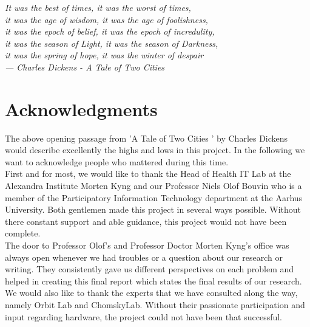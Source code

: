 
\begin{flushright}{\slshape    
	It was the best of times, it was the worst of times,\\
	it was the age of wisdom, it was the age of foolishness,\\ 
	it was the epoch of belief, it was the epoch of incredulity,\\ 
	it was the season of Light, it was the season of Darkness,\\
	it was the spring of hope, it was the winter of despair\\ \medskip
    --- Charles Dickens - A Tale of Two Cities \cite{dickens}}
\end{flushright}



\bigskip

\begingroup
\let\clearpage\relax
\let\cleardoublepage\relax
\let\cleardoublepage\relax
\chapter*{Acknowledgments}

The above opening passage from 'A Tale of Two  Cities ' by Charles Dickens would describe excellently the highs and lows in this project. In the following we want to acknowledge people who mattered during this time.\\

First and for most, we would like to thank the Head of Health IT Lab at the Alexandra Institute Morten Kyng and our Professor Niels Olof Bouvin who is a member of the Participatory Information Technology department at the Aarhus University. Both gentlemen made this project in several ways possible. Without there constant support and able guidance, this project would not have been complete.\\

The door to Professor Olof's and Professor Doctor Morten Kyng's office was always open whenever we had troubles or a question about our research or writing. They consistently gave us different perspectives on each problem and helped in creating this final report which states the final results of our research.\\

We would also like to thank the experts that we have consulted along the way, namely Orbit Lab and ChomskyLab. 
Without their passionate participation and input regarding hardware, the project could not have been that successful.
\endgroup



